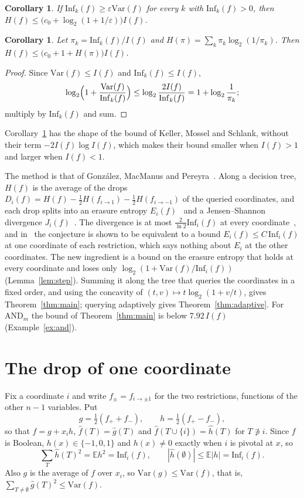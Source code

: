 \documentclass[11pt]{amsart}
\newtheorem{corollary}[theorem]{Corollary}
\theoremstyle{remark}
\newcommand{\Inf}{\mathrm{Inf}}
\newcommand{\Var}{\mathrm{Var}}
\newcommand{\E}{\mathbb{E}}
\begin{document}
\begin{corollary}\label{cor:eps}
If $\Inf_k(f)\ge\varepsilon\Var(f)$ for every $k$ with $\Inf_k(f)>0$, then
$H(f)\le\bigl(c_0+\log_2(1+1/\varepsilon)\bigr)I(f)$.
\end{corollary}

\begin{corollary}\label{cor:pi}
Let $\pi_k=\Inf_k(f)/I(f)$ and $H(\pi)=\sum_k\pi_k\log_2(1/\pi_k)$. Then $H(f)\le\bigl(c_0+1+H(\pi)\bigr)I(f)$.
\end{corollary}

\begin{proof}
Since $\Var(f)\le I(f)$ and $\Inf_k(f)\le I(f)$,
\[
\log_2\Bigl(1+\frac{\Var(f)}{\Inf_k(f)}\Bigr)\le\log_2\frac{2I(f)}{\Inf_k(f)}=1+\log_2\frac1{\pi_k};
\]
multiply by $\Inf_k(f)$ and sum.
\end{proof}

Corollary~\ref{cor:pi} has the shape of the bound of Keller, Mossel and Schlank, without their term
$-2I(f)\log I(f)$, which makes their bound smaller when $I(f)>1$ and larger when $I(f)<1$.

The method is that of Gonz\'alez, MacManus and Pereyra~\cite{GMP}. Along a decision tree, $H(f)$ is the average of the
drops $D_i(f)=H(f)-\frac12H(f_{i\to1})-\frac12H(f_{i\to-1})$ of the queried coordinates, and each drop splits into an
erasure entropy $E_i(f)$~\cite{VW08} and a Jensen--Shannon divergence $J_i(f)$~\cite[Appendix~B]{GMP}. The divergence is
at most $\frac2{\ln2}\Inf_i(f)$ at every coordinate~\cite[Lemma~3]{Shm1}, and in~\cite{Shm1} the conjecture is shown to
be equivalent to a bound $E_i(f)\le C\,\Inf_i(f)$ at one coordinate of each restriction, which says nothing about $E_i$
at the other coordinates. The new ingredient is a bound on the erasure entropy that holds at every coordinate and loses
only $\log_2(1+\Var(f)/\Inf_i(f))$ (Lemma~\ref{lem:step}). Summing it along the tree that queries the coordinates in a
fixed order, and using the concavity of $(t,v)\mapsto t\log_2(1+v/t)$, gives Theorem~\ref{thm:main}; querying adaptively
gives Theorem~\ref{thm:adaptive}. For $\mathrm{AND}_m$ the bound of Theorem~\ref{thm:main} is below $7.92\,I(f)$
(Example~\ref{ex:and}).

\section{The drop of one coordinate}\label{sec:drop}

Fix a coordinate $i$ and write $f_{\pm}=f_{i\to\pm1}$ for the two restrictions, functions of the other $n-1$
variables. Put
\[
g=\tfrac12(f_++f_-),\qquad h=\tfrac12(f_+-f_-),
\]
so that $f=g+x_ih$, $\hat f(T)=\hat g(T)$ and $\hat f(T\cup\{i\})=\hat h(T)$ for $T\not\ni i$. Since $f$ is Boolean,
$h(x)\in\{-1,0,1\}$ and $h(x)\ne0$ exactly when $i$ is pivotal at $x$, so
\begin{equation}\label{eq:h}
\sum_T\hat h(T)^2=\E h^2=\Inf_i(f),\qquad |\hat h(\emptyset)|\le\E|h|=\Inf_i(f).
\end{equation}
Also $g$ is the average of $f$ over $x_i$, so $\Var(g)\le\Var(f)$, that is, $\sum_{T\ne\emptyset}\hat g(T)^2\le\Var(f)$.
\end{document}
